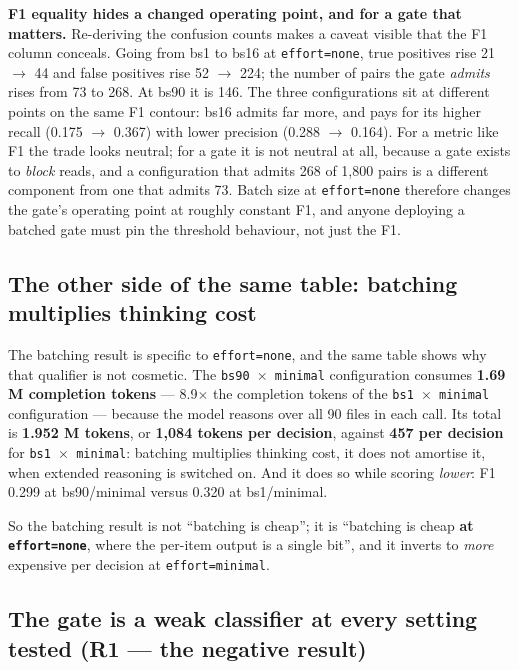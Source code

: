 \documentclass[11pt,a4paper]{article}
\begin{document}
\textbf{F1 equality hides a changed operating point, and for a gate that matters.} Re-deriving the confusion counts makes a caveat visible that the F1 column conceals. Going from bs1 to bs16 at \texttt{effort=none}, true positives rise 21 $\to$ 44 and false positives rise 52 $\to$ 224; the number of pairs the gate \emph{admits} rises from 73 to 268. At bs90 it is 146. The three configurations sit at different points on the same F1 contour: bs16 admits far more, and pays for its higher recall (0.175 $\to$ 0.367) with lower precision (0.288 $\to$ 0.164). For a metric like F1 the trade looks neutral; for a gate it is not neutral at all, because a gate exists to \emph{block} reads, and a configuration that admits 268 of 1,800 pairs is a different component from one that admits 73. Batch size at \texttt{effort=none} therefore changes the gate's operating point at roughly constant F1, and anyone deploying a batched gate must pin the threshold behaviour, not just the F1.

\subsection{The other side of the same table: batching multiplies thinking cost}

The batching result is specific to \texttt{effort=none}, and the same table shows why that qualifier is not cosmetic. The \texttt{bs90 $\times$ minimal} configuration consumes \textbf{1.69 M completion tokens} --- 8.9$\times$ the completion tokens of the \texttt{bs1 $\times$ minimal} configuration --- because the model reasons over all 90 files in each call. Its total is \textbf{1.952 M tokens}, or \textbf{1,084 tokens per decision}, against \textbf{457 per decision} for \texttt{bs1 $\times$ minimal}: batching multiplies thinking cost, it does not amortise it, when extended reasoning is switched on. And it does so while scoring \emph{lower}: F1 0.299 at bs90/minimal versus 0.320 at bs1/minimal.

So the batching result is not ``batching is cheap''; it is ``batching is cheap \textbf{at \texttt{effort=none}}, where the per-item output is a single bit'', and it inverts to \emph{more} expensive per decision at \texttt{effort=minimal}.

\subsection{The gate is a weak classifier at every setting tested (R1 --- the negative result)}
\end{document}
